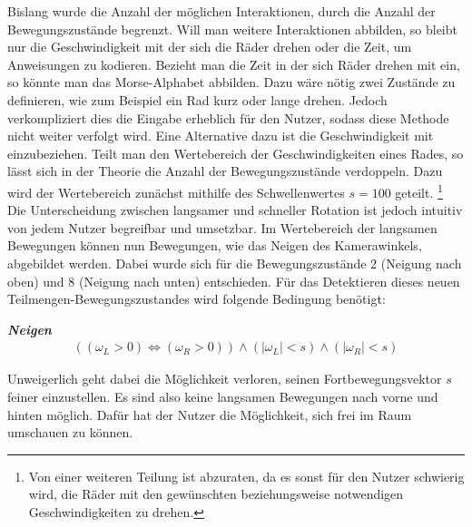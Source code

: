 Bislang wurde die Anzahl der möglichen Interaktionen, durch die Anzahl der Bewegungszustände begrenzt.
Will man weitere Interaktionen abbilden, so bleibt nur die Geschwindigkeit mit der sich die Räder drehen oder die Zeit, um Anweisungen zu kodieren.
Bezieht man die Zeit in der sich Räder drehen mit ein, so könnte man das Morse-Alphabet abbilden. Dazu wäre nötig zwei Zustände zu definieren, wie zum Beispiel ein Rad kurz oder lange drehen.
Jedoch verkompliziert dies die Eingabe erheblich für den Nutzer, sodass diese Methode nicht weiter verfolgt wird.
Eine Alternative dazu ist die Geschwindigkeit mit einzubeziehen.
Teilt man den Wertebereich der Geschwindigkeiten eines Rades, so lässt sich in der Theorie die Anzahl der Bewegungszustände verdoppeln.
Dazu wird der Wertebereich zunächst mithilfe des Schwellenwertes $s = 100$ geteilt.
\footnote{Von einer weiteren Teilung ist abzuraten, da es sonst für den Nutzer schwierig wird, die Räder mit den gewünschten beziehungsweise notwendigen Geschwindigkeiten zu drehen.}
Die Unterscheidung zwischen langsamer und schneller Rotation ist jedoch intuitiv von jedem Nutzer begreifbar und umsetzbar.
Im Wertebereich der langsamen Bewegungen können nun Bewegungen, wie das Neigen des Kamerawinkels, abgebildet werden.
Dabei wurde sich für die Bewegungszustände 2 (Neigung nach oben) und 8 (Neigung nach unten) entschieden.
Für das Detektieren dieses neuen Teilmengen-Bewegungszustandes wird folgende Bedingung benötigt:

\textbf{\textit{Neigen}}
\begin{align}
    ((\omega_L > 0) \Leftrightarrow (\omega_R > 0))  \land (|\omega_L| < s) \land (|\omega_R| < s)
\end{align}

Unweigerlich geht dabei die Möglichkeit verloren, seinen Fortbewegungsvektor $s$ feiner einzustellen.
Es sind also keine langsamen Bewegungen nach vorne und hinten möglich.
Dafür hat der Nutzer die Möglichkeit, sich frei im Raum umschauen zu können.

